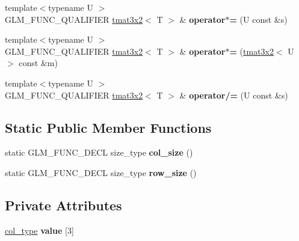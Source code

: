 \begin{DoxyCompactItemize}
\item 
\hypertarget{structglm_1_1detail_1_1tmat3x2_a06989065ea74650cd09e1be9a496770b}{}{\footnotesize template$<$typename U $>$ }\\G\+L\+M\+\_\+\+F\+U\+N\+C\+\_\+\+Q\+U\+A\+L\+I\+F\+I\+E\+R \hyperlink{structglm_1_1detail_1_1tmat3x2}{tmat3x2}$<$ T $>$ \& {\bfseries operator$\ast$=} (U const \&s)\label{structglm_1_1detail_1_1tmat3x2_a06989065ea74650cd09e1be9a496770b}

\item 
\hypertarget{structglm_1_1detail_1_1tmat3x2_aa1aff25eeaa4680c3e78d65a2485e4fd}{}{\footnotesize template$<$typename U $>$ }\\G\+L\+M\+\_\+\+F\+U\+N\+C\+\_\+\+Q\+U\+A\+L\+I\+F\+I\+E\+R \hyperlink{structglm_1_1detail_1_1tmat3x2}{tmat3x2}$<$ T $>$ \& {\bfseries operator$\ast$=} (\hyperlink{structglm_1_1detail_1_1tmat3x2}{tmat3x2}$<$ U $>$ const \&m)\label{structglm_1_1detail_1_1tmat3x2_aa1aff25eeaa4680c3e78d65a2485e4fd}

\item 
\hypertarget{structglm_1_1detail_1_1tmat3x2_a1aee04248ee1f4251f278821b60f0b73}{}{\footnotesize template$<$typename U $>$ }\\G\+L\+M\+\_\+\+F\+U\+N\+C\+\_\+\+Q\+U\+A\+L\+I\+F\+I\+E\+R \hyperlink{structglm_1_1detail_1_1tmat3x2}{tmat3x2}$<$ T $>$ \& {\bfseries operator/=} (U const \&s)\label{structglm_1_1detail_1_1tmat3x2_a1aee04248ee1f4251f278821b60f0b73}

\end{DoxyCompactItemize}
\subsection*{Static Public Member Functions}
\begin{DoxyCompactItemize}
\item 
\hypertarget{structglm_1_1detail_1_1tmat3x2_ad7d1e84cf2bece265c157fa05ded68ae}{}static G\+L\+M\+\_\+\+F\+U\+N\+C\+\_\+\+D\+E\+C\+L size\+\_\+type {\bfseries col\+\_\+size} ()\label{structglm_1_1detail_1_1tmat3x2_ad7d1e84cf2bece265c157fa05ded68ae}

\item 
\hypertarget{structglm_1_1detail_1_1tmat3x2_a5a957db4e6d70144fafa69398f66fa34}{}static G\+L\+M\+\_\+\+F\+U\+N\+C\+\_\+\+D\+E\+C\+L size\+\_\+type {\bfseries row\+\_\+size} ()\label{structglm_1_1detail_1_1tmat3x2_a5a957db4e6d70144fafa69398f66fa34}

\end{DoxyCompactItemize}
\subsection*{Private Attributes}
\begin{DoxyCompactItemize}
\item 
\hypertarget{structglm_1_1detail_1_1tmat3x2_ae5f980e7bf61752248ed359a010ad7a5}{}\hyperlink{structglm_1_1detail_1_1tvec2}{col\+\_\+type} {\bfseries value} \mbox{[}3\mbox{]}\label{structglm_1_1detail_1_1tmat3x2_ae5f980e7bf61752248ed359a010ad7a5}

\end{DoxyCompactItemize}


